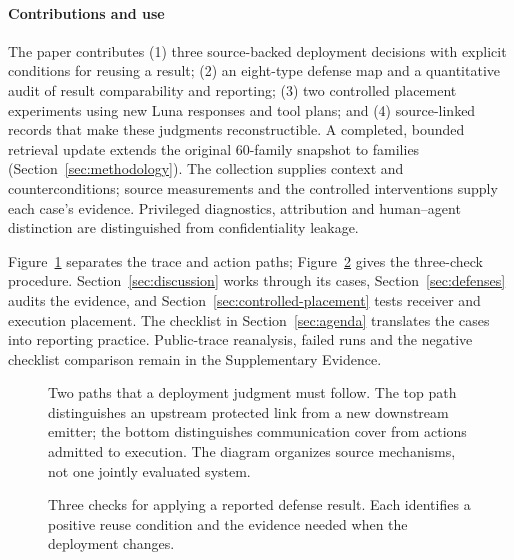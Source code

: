 \paragraph{Contributions and use}
The paper contributes (1) three source-backed deployment decisions with explicit conditions for reusing a result; (2) an eight-type defense map and a quantitative audit of result comparability and reporting; (3) two controlled placement experiments using new Luna responses and tool plans; and (4) source-linked records that make these judgments reconstructible. A completed, bounded retrieval update extends the original 60-family snapshot to \FinalN{} families (Section~\ref{sec:methodology}). The collection supplies context and counterconditions; source measurements and the controlled interventions supply each case's evidence. Privileged diagnostics, attribution and human--agent distinction are distinguished from confidentiality leakage.

Figure~\ref{fig:system-model} separates the trace and action paths; Figure~\ref{fig:defense-decision} gives the three-check procedure. Section~\ref{sec:discussion} works through its cases, Section~\ref{sec:defenses} audits the evidence, and Section~\ref{sec:controlled-placement} tests receiver and execution placement. The checklist in Section~\ref{sec:agenda} translates the cases into reporting practice. Public-trace reanalysis, failed runs and the negative checklist comparison remain in the Supplementary Evidence.

\begin{figure}[t]
\centering
\caption{Two paths that a deployment judgment must follow. The top path distinguishes an upstream protected link from a new downstream emitter; the bottom distinguishes communication cover from actions admitted to execution. The diagram organizes source mechanisms, not one jointly evaluated system.}
\label{fig:system-model}
\end{figure}

\begin{figure}[t]
\centering
\caption{Three checks for applying a reported defense result. Each identifies a positive reuse condition and the evidence needed when the deployment changes.}
\label{fig:defense-decision}
\end{figure}
